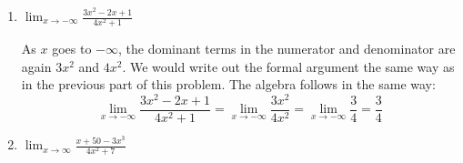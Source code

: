 \documentclass{article}
\begin{document}
\begin{enumerate}
\begin{enumerate}
    \begin{solution}
      Using the idea of the previous part, we can identify that, as $x$ goes to $\infty$,
      the dominant term in the numerator is $3x^2$, 
      and the dominant term in the denominator is $4x^2$. \\
      Writing this formally, for the numerator, as $x\to\infty$: $3x^2>>-2x>>1$, so $3x^2-2x+1 \sim3x^2$. \\
      In the denominator as $x\to \infty$, $4x^2>>1$, so $4x^2 +1 \sim 4x^2$. This means that
      \begin{align*}
        \lim_{x \to \infty} \frac{3x^2-2x+1}{4x^2+1} &= \lim_{x \to \infty} \frac{3x^2}{4x^2}.\\
        \intertext{We can simplify this using algebra and evaluate the limit.}
        \lim_{x \to \infty} \frac{3x^2-2x+1}{4x^2+1} &= \lim_{x \to \infty} \frac{3x^2}{4x^2}= \lim_{x\to\infty} \frac{3}{4} = \frac{3}{4}
      \end{align*}
    \end{solution}

  \item

    \begin{problem}[\vfill]
      $\displaystyle \lim_{x \to -\infty} \frac{3x^2 - 2x + 1}{4x^2 + 1}$      
    \end{problem}

    \begin{solution}
      As $x$ goes to $-\infty$, the dominant terms in the numerator and denominator are again $3x^2$ and $4x^2$. We would write out the formal argument the same way as in the previous part of this problem. The algebra follows in the same way:
      $$\lim_{x \to -\infty} \frac{3x^2-2x+1}{4x^2+1} = \lim_{x \to -\infty} \frac{3x^2}{4x^2}= \lim_{x\to-\infty} \frac{3}{4} = \frac{3}{4}$$
    \end{solution}

  \item
    \begin{problem}[\vfill]
      $\displaystyle \lim_{x \to \infty} \frac{x + 50 - 3x^3}{4x^2 + 7}$      
    \end{problem}


\end{enumerate}
\end{enumerate}
\end{document}
